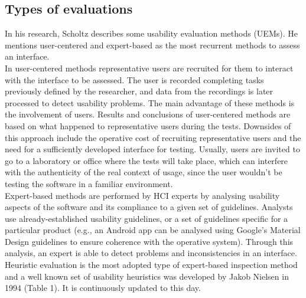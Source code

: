 \subsection{Types of evaluations}
In his research, Scholtz \cite{Scholtz_undated-ip} describes some usability evaluation methods (UEMs). He mentions user-centered and expert-based as the most recurrent methods to assess an interface.\\
In user-centered methods representative users are recruited for them to interact with the interface to be assessed. The user is recorded completing tasks previously defined by the researcher, and data from the recordings is later processed to detect usability problems. The main advantage of these methods is the involvement of users. Results and conclusions of user-centered methods are based on what happened to representative users during the tests. Downsides of this approach include the operative cost of recruiting representative users and the need for a sufficiently developed interface for testing. Usually, users are invited to go to a laboratory or office where the tests will take place, which can interfere with the authenticity of the real context of usage, since the user wouldn't be testing the software in a familiar environment. \\
Expert-based methods are performed by HCI experts by analysing usability aspects of the software and its compliance to a given set of guidelines. Analysts use already-established usability guidelines, or a set of guidelines specific for a particular product (e.g., an Android app can be analysed using Google's Material Design guidelines to ensure coherence with the operative system). Through this analysis, an expert is able to detect problems and inconsistencies in an interface. Heuristic evaluation is the most adopted type of expert-based inspection method and a well known set of usability heuristics was developed by Jakob Nielsen in 1994 (Table 1). It is continuously updated to this day.

